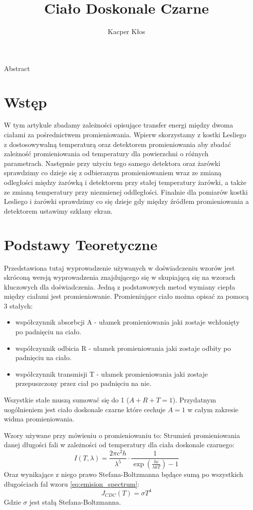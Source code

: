 \documentclass[12pt]{article}
\title{Ciało Doskonale Czarne}
\author{Kacper Kłos}
\begin{document}
\maketitle

Abstract

\newpage
\section{Wstęp}
W tym artykule zbadamy zależności opisujące transfer energi między dwoma ciałami za pośrednictwem promieniowania. Wpierw skorzystamy z kostki Lesliego z dostosowywalną temperaturą oraz detektorem promieniowania aby zbadać zależność promieniowania od temperatury dla powierzchni o różnych parametrach. Następnie przy użyciu tego samego detektora oraz żarówki sprawdzimy co dzieje się z odbieranym promieniowaniem wraz ze zmianą odległości między żarówką i detektorem przy stałej temperatury żarówki, a także ze zmianą temperatury przy niezmienej oddległości. Finalnie dla pomiarów kostki Lesliego i żarówki sprawdzimy co się dzieje gdy między źródłem promieniowania a detektorem ustawimy szklany ekran.
\section{Podstawy Teoretyczne}
Przedstawiona tutaj wyprowadzenie używanych w doświadczeniu wzorów jest skróconą wersją wyprowadzenia znajdującego się w \cite{skrypt} skupiającą się na wzorach kluczowych dla doświadczenia.
Jedną z podstawowych metod wymiany ciepła między ciałami jest promieniowanie.
Promieniujące ciało można opisać za pomocą 3 stałych:
\begin{itemize}
    \item współczynnik absorbcji A - ułamek promieniowania jaki zostaje wchłonięty po padnięciu na ciało.
    \item współczynnik odbicia R - ułamek promieniowania jaki zostaje odbity po padnięciu na ciało.
    \item współczynnik transmisji T - ułamek promieniowania jaki zostaje przepuszczony przez ciał po padnięciu na nie.
\end{itemize}
Wszystkie stałe muszą sumować się do 1 ($A+R+T = 1$).
Przydatnym uogólnieniem jest ciało doskonale czarne które cechuje $A=1$ w całym zakresie widma promieniowania.

Wzory używane przy mówieniu o promieniowaniu to:
Strumień promieniowania danej długości fali w zależności od temperatury dla ciała doskonale czarnego:
\begin{equation}
    I(T, \lambda) = \frac{2\pi c^2 h}{\lambda^5} \cdot \frac{1}{\exp(\frac{hc}{\lambda k T}) -1}
    \label{eq:emision_spectrum}
\end{equation}
Oraz wynikające z niego prawo Stefana-Boltzmanna będące sumą po wszystkich długościach fal wzoru \ref{eq:emision_spectrum}:
\begin{equation}
    J_{CDC}(T) = \sigma T^4
    \label{eq:boltzman_law}
\end{equation}
Gdzie $\sigma$ jest stałą Stefana-Boltzmanna.
\end{document}
